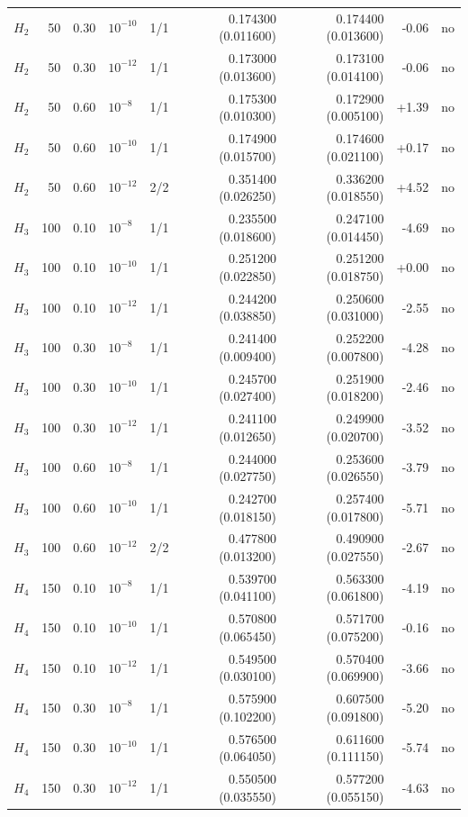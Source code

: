 \begin{longtable}{lrrlrrrrc}
$H_2$ & 50 & 0.30 & $10^{-10}$ & 1/1 & 0.174300 (0.011600) & 0.174400 (0.013600) & -0.06 & no\\
$H_2$ & 50 & 0.30 & $10^{-12}$ & 1/1 & 0.173000 (0.013600) & 0.173100 (0.014100) & -0.06 & no\\
$H_2$ & 50 & 0.60 & $10^{-8}$ & 1/1 & 0.175300 (0.010300) & 0.172900 (0.005100) & +1.39 & no\\
$H_2$ & 50 & 0.60 & $10^{-10}$ & 1/1 & 0.174900 (0.015700) & 0.174600 (0.021100) & +0.17 & no\\
$H_2$ & 50 & 0.60 & $10^{-12}$ & 2/2 & 0.351400 (0.026250) & 0.336200 (0.018550) & +4.52 & no\\
$H_3$ & 100 & 0.10 & $10^{-8}$ & 1/1 & 0.235500 (0.018600) & 0.247100 (0.014450) & -4.69 & no\\
$H_3$ & 100 & 0.10 & $10^{-10}$ & 1/1 & 0.251200 (0.022850) & 0.251200 (0.018750) & +0.00 & no\\
$H_3$ & 100 & 0.10 & $10^{-12}$ & 1/1 & 0.244200 (0.038850) & 0.250600 (0.031000) & -2.55 & no\\
$H_3$ & 100 & 0.30 & $10^{-8}$ & 1/1 & 0.241400 (0.009400) & 0.252200 (0.007800) & -4.28 & no\\
$H_3$ & 100 & 0.30 & $10^{-10}$ & 1/1 & 0.245700 (0.027400) & 0.251900 (0.018200) & -2.46 & no\\
$H_3$ & 100 & 0.30 & $10^{-12}$ & 1/1 & 0.241100 (0.012650) & 0.249900 (0.020700) & -3.52 & no\\
$H_3$ & 100 & 0.60 & $10^{-8}$ & 1/1 & 0.244000 (0.027750) & 0.253600 (0.026550) & -3.79 & no\\
$H_3$ & 100 & 0.60 & $10^{-10}$ & 1/1 & 0.242700 (0.018150) & 0.257400 (0.017800) & -5.71 & no\\
$H_3$ & 100 & 0.60 & $10^{-12}$ & 2/2 & 0.477800 (0.013200) & 0.490900 (0.027550) & -2.67 & no\\
$H_4$ & 150 & 0.10 & $10^{-8}$ & 1/1 & 0.539700 (0.041100) & 0.563300 (0.061800) & -4.19 & no\\
$H_4$ & 150 & 0.10 & $10^{-10}$ & 1/1 & 0.570800 (0.065450) & 0.571700 (0.075200) & -0.16 & no\\
$H_4$ & 150 & 0.10 & $10^{-12}$ & 1/1 & 0.549500 (0.030100) & 0.570400 (0.069900) & -3.66 & no\\
$H_4$ & 150 & 0.30 & $10^{-8}$ & 1/1 & 0.575900 (0.102200) & 0.607500 (0.091800) & -5.20 & no\\
$H_4$ & 150 & 0.30 & $10^{-10}$ & 1/1 & 0.576500 (0.064050) & 0.611600 (0.111150) & -5.74 & no\\
$H_4$ & 150 & 0.30 & $10^{-12}$ & 1/1 & 0.550500 (0.035550) & 0.577200 (0.055150) & -4.63 & no\\

\end{longtable}
